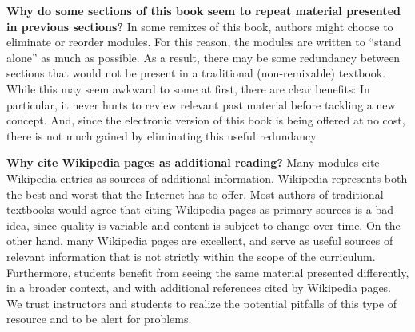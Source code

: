 {\bf Why do some sections of this book seem to repeat material presented in previous sections?}
In some remixes of this book, authors might choose to eliminate or reorder modules.  
For this reason, the modules are written to ``stand alone'' as much as possible.
As a result, there may be some redundancy between sections that would not be present in a traditional (non-remixable) textbook.
While this may seem awkward to some at first, there are clear benefits: In particular, it never hurts to review relevant past material before tackling a new concept.
And, since the electronic version of this book is being offered at no cost, there is not much gained by eliminating this useful redundancy.

{\bf Why cite Wikipedia pages as additional reading?}
Many modules cite Wikipedia entries as sources of additional information.
Wikipedia represents both the best and worst that the Internet has to offer.
Most authors of traditional textbooks would agree that citing Wikipedia pages as primary sources is a bad idea, since quality is variable and
content is subject to change over time.
On the other hand, many Wikipedia pages are excellent, and serve as useful sources of relevant information that is not strictly within the scope of the curriculum.  
Furthermore, students benefit from seeing the same material presented differently, in a broader context, and with additional references cited by Wikipedia pages. 
We trust instructors and students to realize the potential pitfalls of this type of resource and to be alert for problems.


